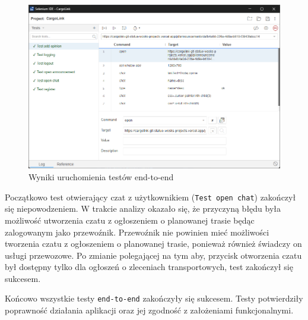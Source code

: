 \begin{figure}[H]
  \centering
    \includegraphics[width=1\linewidth]{rozdzial2/test_end_to_end_wyniki.png}
  \caption{Wyniki uruchomienia testów end-to-end}
  \label{Testy end-to-end wyniki}
\end{figure}

Początkowo test otwierający czat z użytkownikiem (\texttt{Test open chat}) zakończył się niepowodzeniem. W trakcie analizy okazało się, że przyczyną błędu była możliwość utworzenia czatu z ogłoszeniem o planowanej trasie będąc zalogowanym jako przewoźnik. Przewoźnik nie powinien mieć możliwości tworzenia czatu z ogłoszeniem o planowanej trasie, ponieważ również świadczy on usługi przewozowe. Po zmianie polegającej na tym aby, przycisk otworzenia czatu był dostępny tylko dla ogłoszeń o zleceniach transportowych, test zakończył się sukcesem.

Końcowo wszystkie testy \texttt{end-to-end} zakończyły się sukcesem. Testy potwierdziły poprawność działania aplikacji oraz jej zgodność z założeniami funkcjonalnymi.